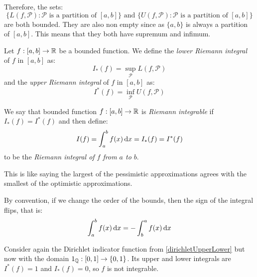 \documentclass[../main.tex]{subfiles}
\begin{document}
Therefore, the sets:
\[
  \{L(f, \mathcal{P}): \mathcal{P} \text{ is a partition of $[a, b]$}\} \text{ and } \{U(f, \mathcal{P}): \mathcal{P} \text{ is a partition of $[a, b]$}\}
\]
are both bounded.
They are also non empty since as $\{a,b\}$ is always a partition of $[a, b]$.
This means that they both have supremum and infimum.
\begin{definition}
  Let $f: [a, b] \to \mathbb{R}$ be a bounded function.
  We define the \textit{lower Riemann integral} of $f$ in $[a, b]$ as:
  \[
    I_{*}(f) = \sup_{\mathcal{P}} L(f, \mathcal{P})
  \]
  and the \textit{upper Riemann integral} of $f$ in $[a, b]$ as:
  \[
    I^{*}(f) = \inf_{\mathcal{P}} U(f, \mathcal{P})
  \]
\end{definition}
\begin{definition}
  We say that bounded function $f: [a, b] \to \mathbb{R}$ is \textit{Riemann integrable} if $I_{*}(f) = I^{*}(f)$ and then define:
  \label{integralDef}
  \[
    I(f) = \int_{a}^{b} f(x) \d{x} = I_{*}(f) = I^{*}(f)
  \]
  to be the \textit{Riemann integral of $f$ from $a$ to $b$}.
\end{definition}
\begin{remark}[Intuition]
  This is like saying the largest of the pessimistic approximations agrees with the smallest of the optimistic approximations.
\end{remark}
\begin{remark}
  By convention, if we change the order of the bounds, then the sign of the integral flips, that is:
  \[
    \int_{a}^{b} f(x) \d{x} = - \int_{b}^{a} f(x) \d{x}
  \]
\end{remark}
\begin{example}
  \label{dirichletIntegrable}
  Consider again the Dirichlet indicator function from \cref{dirichletUpperLower} but now with the domain $1_{\mathbb{Q}}: [0, 1] \to \{0, 1\}$.
  Its upper and lower integrals are $I^{*}(f) = 1$ and $I_{*}(f) = 0$, so $f$ is not integrable.
\end{example}
\end{document}
